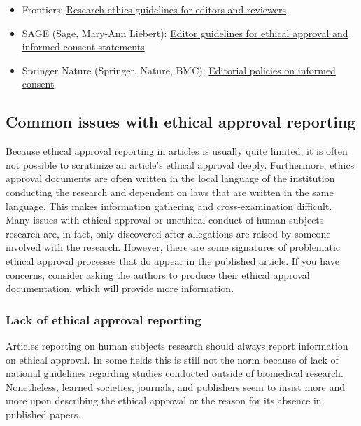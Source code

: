 \documentclass[letterpaper, 12pt]{article}
\begin{document}
\begin{itemize}
    \setlength\itemsep{-0.5em}
    \item Frontiers: \href{https://www.frontiersin.org/files/pdf/Research%20ethics_guidelines%20for%20editors%20and%20reviewers.pdf}{Research ethics guidelines for editors and reviewers}
    \item SAGE (Sage, Mary-Ann Liebert): \href{https://uk.sagepub.com/sites/default/files/editor_guidelines.pdf}{Editor guidelines for ethical approval and informed consent statements}
    \item Springer Nature (Springer, Nature, BMC): \href{https://www.springer.com/gp/editorial-policies/informed-consent?srsltid=AfmBOoryhgl-fRz6G7UtywN7SY2D62DcbOkNGsW8LHI4PtwA75TfNNFD}{Editorial policies on informed consent}
\end{itemize}

\subsection*{Common issues with ethical approval reporting}

Because ethical approval reporting in articles is usually quite limited, it is often not possible to scrutinize an article's ethical approval deeply. Furthermore, ethics approval documents are often written in the local language of the institution conducting the research and dependent on laws that are written in the same language. This makes information gathering and cross-examination difficult. Many issues with ethical approval or unethical conduct of human subjects research are, in fact, only discovered after allegations are raised by someone involved with the research. However, there are some signatures of problematic ethical approval processes that do appear in the published article. If you have concerns, consider asking the authors to produce their ethical approval documentation, which will provide more information.

\subsubsection*{Lack of ethical approval reporting}

Articles reporting on human subjects research should always report information on ethical approval. In some fields this is still not the norm because of lack of national guidelines regarding studies conducted outside of biomedical research. Nonetheless, learned societies, journals, and publishers seem to insist more and more upon describing the ethical approval or the reason for its absence in published papers.
\end{document}
